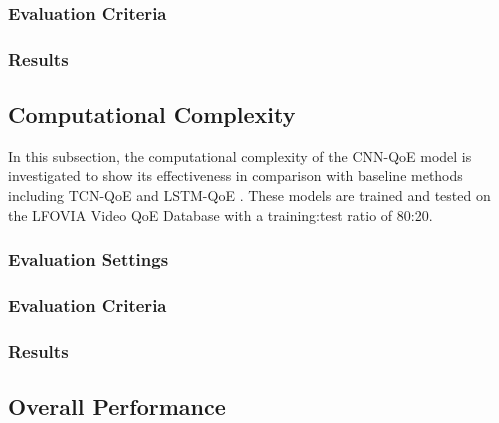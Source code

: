   \subsubsection{Evaluation Criteria}
  \label{sec:EvaluationAccuracy_Criteria}
  
  
  \subsubsection{Results}
  \label{sec:EvaluationAccuracy_Results}
  


\subsection{Computational Complexity}
\label{sec:EvaluationComplexity}
  In this subsection, the computational complexity of the CNN-QoE model is investigated to show its effectiveness in comparison with baseline methods including TCN-QoE and LSTM-QoE \cite{QoEModel_LSTM}.
  These models are trained and tested on the LFOVIA Video QoE Database with a training:test ratio of 80:20.
  
  
  \subsubsection{Evaluation Settings}
  \label{sec:EvaluationComplexity_Settings}
  
  
  \subsubsection{Evaluation Criteria}
  \label{sec:EvaluationComplexity_Criteria}
  
  
  \subsubsection{Results}
  \label{sec:EvaluationComplexity_Results}
  
  

\subsection{Overall Performance}
\label{sec:EvaluationOverall}
